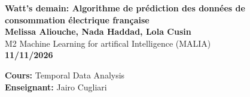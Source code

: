\begin{titlepage}
    \begin{center}
        \vspace*{0.5cm}
        \LARGE
        \textbf{Watt's demain: Algorithme de prédiction des données de consommation électrique française}\\
            
        \vspace{1cm}
        \Large
        \textbf{Melissa Aliouche, Nada Haddad, Lola Cusin}\\
        M2 Machine Learning for artifical Intelligence (MALIA)\\
        \vspace{0.5cm}
        \large
        \textbf{11/11/2026}\\
            
        \vfill

        
        
        
        \textbf{Cours: } Temporal Data Analysis\\        
        \textbf{Enseignant: } Jairo Cugliari
        
    \end{center}
\end{titlepage}